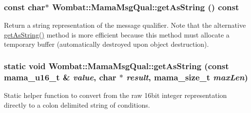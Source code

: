 \label{classWombat_1_1MamaMsgQual_ac69c4a732a33ace286a6ac338b5ebab6}
\hypertarget{classWombat_1_1MamaMsgQual_a96ea56646e8a483883ed685009897163}{
\subsubsection[{getAsString}]{\setlength{\rightskip}{0pt plus 5cm}const char$\ast$ Wombat::MamaMsgQual::getAsString () const}}
\label{classWombat_1_1MamaMsgQual_a96ea56646e8a483883ed685009897163}


Return a string representation of the message qualifier. Note that the alternative \hyperlink{classWombat_1_1MamaMsgQual_ac69c4a732a33ace286a6ac338b5ebab6}{getAsString()} method is more efficient because this method must allocate a temporary buffer (automatically destroyed upon object destruction). \hypertarget{classWombat_1_1MamaMsgQual_a41a0a63b5777c6f9937076f0d47fa03f}{
\subsubsection[{getAsString}]{\setlength{\rightskip}{0pt plus 5cm}static void Wombat::MamaMsgQual::getAsString (const mama\_\-u16\_\-t \& {\em value}, \/  char $\ast$ {\em result}, \/  {\bf mama\_\-size\_\-t} {\em maxLen})}}
\label{classWombat_1_1MamaMsgQual_a41a0a63b5777c6f9937076f0d47fa03f}


Static helper function to convert from the raw 16bit integer representation directly to a colon delimited string of conditions. 